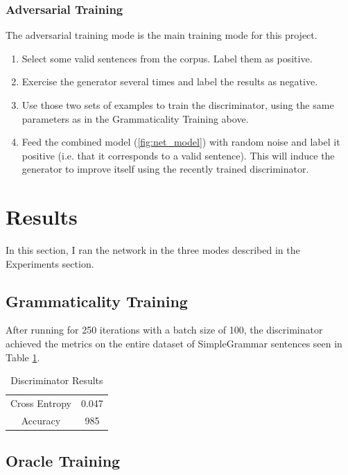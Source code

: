 \documentclass[12pt]{article}
\begin{document}
\subsubsection{Adversarial Training}

The adversarial training mode is the main training mode for this project.

\begin{enumerate}
    \item Select some valid sentences from the corpus. Label them as positive.
    \item Exercise the generator several times and label the results as negative.
    \item Use those two sets of examples to train the discriminator, using the same parameters as in the Grammaticality Training above.
    \item Feed the combined model (\ref{fig:net_model}) with random noise and label it positive (i.e. that it corresponds to a valid sentence). This will induce the generator to improve itself using the recently trained discriminator.
\end{enumerate}

\section{Results}

In this section, I ran the network in the three modes described in the Experiments section.

\subsection{Grammaticality Training}

After running for 250 iterations with a batch size of 100, the discriminator achieved the metrics on the entire dataset of SimpleGrammar sentences seen in Table \ref{tab:disc_results}.

\begin{table}[ht]
    \centering
    \begin{tabular}{c|c}
        \hline
        Cross Entropy & 0.047 \\
        Accuracy & 985 \\
    \end{tabular}
    \caption{Discriminator Results}
    \label{tab:disc_results}
\end{table}

\subsection{Oracle Training}
\end{document}
